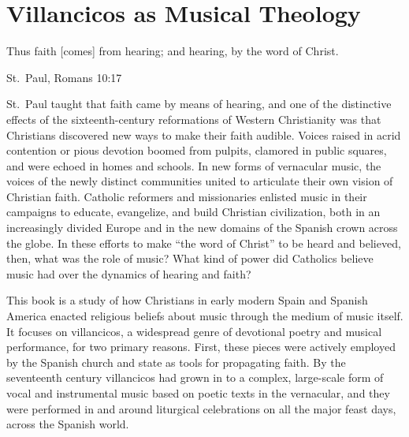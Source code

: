 
\chapter{Villancicos as Musical Theology}

\epigraph{%

Thus faith [comes] from hearing; and hearing, by the word of Christ.%
}{St.~Paul, Romans 10:17}

St.~Paul taught that faith came by means of hearing, and one of the distinctive effects of the sixteenth-century reformations of Western Christianity was that Christians discovered new ways to make their faith audible.
Voices raised in acrid contention or pious devotion boomed from pulpits, clamored in public squares, and were echoed in homes and schools.
In new forms of vernacular music, the voices of the newly distinct communities united to articulate their own vision of Christian faith.
Catholic reformers and missionaries enlisted music in their campaigns to educate, evangelize, and build Christian civilization, both in an increasingly divided Europe and in the new domains of the Spanish crown across the globe. 
In these efforts to make \enquote{the word of Christ} to be heard and believed, then, what was the role of music?
What kind of power did Catholics believe music had over the dynamics of hearing and faith?

This book is a study of how Christians in early modern Spain and Spanish America enacted religious beliefs about music through the medium of music itself.
It focuses on villancicos, a widespread genre of devotional poetry and musical performance, for two primary reasons.
First, these pieces were actively employed by the Spanish church and state as tools for propagating faith.
By the seventeenth century villancicos had grown in to a complex, large-scale form of vocal and instrumental music based on poetic texts in the vernacular, and they were performed in and around liturgical celebrations on all the major feast days, across the Spanish world.


